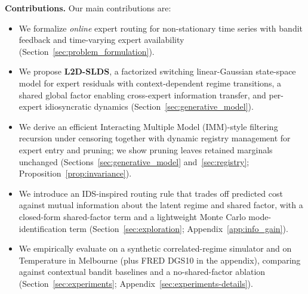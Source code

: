 \textbf{Contributions.}
Our main contributions are:
\begin{itemize}[topsep=2pt,itemsep=1pt,parsep=0pt,leftmargin=1.2em]
    \item We formalize \emph{online} expert routing for non-stationary time series with bandit feedback and time-varying expert availability (Section~\ref{sec:problem_formulation}).
    \item We propose \textbf{L2D-SLDS}, a factorized switching linear-Gaussian state-space model for expert residuals with context-dependent regime transitions, a shared global factor enabling cross-expert information transfer, and per-expert idiosyncratic dynamics (Section~\ref{sec:generative_model}).
    \item We derive an efficient Interacting Multiple Model (IMM)-style \citep{johnston2002improvement} filtering recursion under censoring together with dynamic registry management for expert entry and pruning; we show pruning leaves retained marginals unchanged (Sections~\ref{sec:generative_model} and~\ref{sec:registry}; Proposition~\ref{prop:invariance}).
    \item We introduce an IDS-inspired routing rule \citep{russo2014learning} that trades off predicted cost against mutual information about the latent regime and shared factor, with a closed-form shared-factor term and a lightweight Monte Carlo mode-identification term (Section~\ref{sec:exploration}; Appendix~\ref{app:info_gain}).
    \item We empirically evaluate on a synthetic correlated-regime simulator and on Temperature in Melbourne \citep{daily_min_temp_melbourne_kaggle} (plus FRED DGS10 in the appendix), comparing against contextual bandit baselines and a no-shared-factor ablation (Section~\ref{sec:experiments}; Appendix~\ref{sec:experiments-details}).
\end{itemize}



